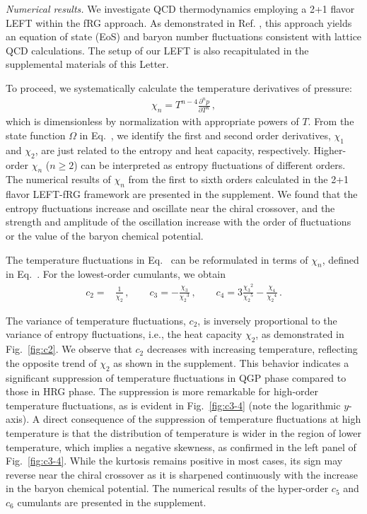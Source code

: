 \documentclass[aps,twocolumn,prd,superscriptaddress,nofootinbib,floatfix]{revtex4-2}
\begin{document}

\textit{Numerical results.}\label{sec:numerical} We investigate QCD thermodynamics employing a 2+1 flavor LEFT within the fRG approach. As demonstrated in Ref. \cite{Wen:2018nkn}, this approach yields an equation of state (EoS) and baryon number fluctuations consistent with lattice QCD calculations. The setup of our LEFT is also recapitulated in the supplemental materials of this Letter.

To proceed, we systematically calculate the temperature derivatives of pressure: 
\begin{align}
    \chi_n=T^{n-4}\frac{\partial^n p}{\partial T^n}\,, \label{eq:chi}
\end{align}
which is dimensionless by normalization with appropriate powers of $T$. From the state function $\Omega$ in Eq.~, we identify the first and second order derivatives, $\chi_1$ and $\chi_2$, are just related to the entropy and heat capacity, respectively. Higher-order $\chi_n$ ($n \geq 2$) can be interpreted as entropy fluctuations of different orders. The numerical results of $\chi_n$ from the first to sixth orders calculated in the 2+1 flavor LEFT-fRG framework are presented in the supplement. We found that the entropy fluctuations increase and oscillate near the chiral crossover, and the strength and amplitude of the oscillation increase with the order of fluctuations or the value of the baryon chemical potential. 

The temperature fluctuations in Eq.~ can be reformulated in terms of $\chi_n$, defined in Eq.~. For the lowest-order cumulants, we obtain
\begin{align}
    c_2=&\frac{1}{\chi_2}\,, \qquad c_3=-\frac{\chi_3}{{\chi_2}^3}\,, \qquad c_4=3\frac{{\chi_3}^2}{{\chi_2}^5}-\frac{\chi_4}{{\chi_2}^4}\,. \label{}
\end{align}

The variance of temperature fluctuations, $c_2$, is inversely proportional to the variance of entropy fluctuations, i.e., the heat capacity $\chi_2$, as demonstrated in Fig.~\ref{fig:c2}. We observe that $c_2$ decreases with increasing temperature, reflecting the opposite trend of $\chi_2$ as shown in the supplement. This behavior indicates a significant suppression of temperature fluctuations in QGP phase compared to those in HRG phase. The suppression is more remarkable for high-order temperature fluctuations, as is evident in Fig.~\ref{fig:c3-4} 
(note the logarithmic $y$-axis). A direct consequence of the suppression of temperature fluctuations at high temperature is that the distribution of temperature is wider in the region of lower temperature, which implies a negative skewness, as confirmed in the left panel of Fig.~\ref{fig:c3-4}. While the kurtosis remains positive in most cases, its sign may reverse near the chiral crossover as it is sharpened continuously with the increase in the baryon chemical potential. The numerical results of the hyper-order $c_5$ and $c_6$ cumulants are presented in the supplement.
\end{document}
